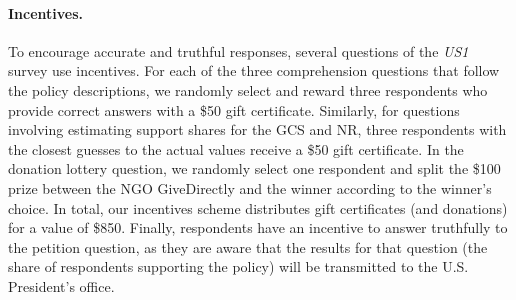 \begin{small}
\paragraph{\small Incentives.} %
To encourage accurate and truthful responses, several questions of the \textit{US1} survey use incentives. For each of the three comprehension questions that follow the policy descriptions, we randomly select and reward three respondents who provide correct answers with a \$50 gift certificate. Similarly, for questions involving estimating support shares for the GCS and NR, three respondents with the closest guesses to the actual values receive a \$50 gift certificate. In the donation lottery question, we randomly select one respondent and split the \$100 prize between the NGO GiveDirectly and the winner according to the winner's choice. In total, our incentives scheme distributes gift certificates (and donations) for a value of \$850. Finally, respondents have an incentive to answer truthfully to the petition question, as they are aware that the results for that question (the share of respondents supporting the policy) will be transmitted to the U.S. President's office.







\end{small}
